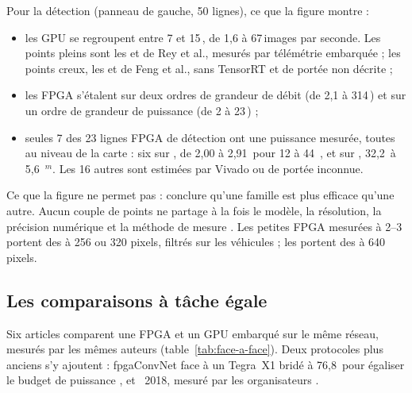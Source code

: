 Pour la détection (panneau de gauche, 50 lignes), ce que la figure montre :
\begin{itemize}
  \item les GPU  se regroupent entre 7 et 15\,, de 1,6 à 67\,images par seconde.
    Les points pleins sont les  et  de Rey et al., mesurés par télémétrie
    embarquée \citep[Table~4]{arxiv-2502.15737-performance-analysis-you-only-look} ; les
    points creux, les  et  de Feng et al., sans TensorRT et de portée
    non décrite \citep[Table~3]{2022-feng-benchmark-analysis-yolo-performance-edge} ;
  \item les FPGA s'étalent sur deux ordres de grandeur de débit (de 2,1 à 314\,) et sur
    un ordre de grandeur de puissance (de 2 à 23\,) ;
  \item seules 7 des 23 lignes FPGA de détection ont une puissance mesurée, toutes au
    niveau de la carte : six  sur , de 2,00 à 2,91\, pour 12 à 44\,
    \citep[§V]{arxiv-2609.24757-npu-accelerator-quantized-real-time}\pp, et  sur
    , 32,2\, à 5,6\,
    \citep[Table~3]{arxiv-2006.08357-codenet-efficient-deployment-input-adaptive}$^{m}$.
    Les 16 autres sont estimées par Vivado ou de portée inconnue.
\end{itemize}
Ce que la figure ne permet pas : conclure qu'une famille est plus efficace qu'une autre.
Aucun couple de points ne partage à la fois le modèle, la résolution, la précision
numérique et la méthode de mesure \deduit. Les petites FPGA mesurées à 2--3\, portent des
 à 256 ou 320 pixels, filtrés sur les véhicules ; les  portent des  à
640 pixels.

\subsection{Les comparaisons à tâche égale}

Six articles comparent une FPGA et un GPU embarqué sur le même réseau, mesurés par les
mêmes auteurs (table~\ref{tab:face-a-face}). Deux protocoles plus anciens s'y ajoutent :
fpgaConvNet face à un Tegra~X1 bridé à 76,8\, pour égaliser le budget de puissance
\citep[§3.1]{arxiv-1711.08740-fpgaconvnet-toolflow-mapping-diverse-convolutional}, et
~2018, mesuré par les organisateurs \citep{2021-xu-dac-sdc-low-power-object}.

